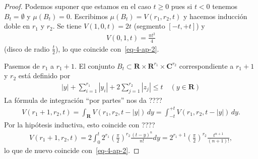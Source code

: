 \documentclass[oneside,bibtotoc,leqno,spanish]{amsbook}
\newcommand{\RR}{\mathbf{R}}
\newcommand{\CC}{\mathbf{C}}
\newcommand{\abs}[1]{\left\lvert#1\right\rvert}
\numberwithin{equation}{section}
\theoremstyle{defi}
\theoremstyle{note}
\theoremstyle{rem}
\numberwithin{theorem}{section}
\numberwithin{proposition}{section}
\numberwithin{definition}{section}
\numberwithin{lemma}{section}
\numberwithin{corollary}{section}
\numberwithin{example}{section}
\numberwithin{footnote}{section}%
\begin{document}
\begin{proof}
Podemos suponer que estamos en el caso $t\geq 0$ pues si $t < 0$ tenemos $B_{t}=\emptyset$ y $\mu(B_{t})=0$.
Escribimos $\mu(B_{t}) = V(r_{1},r_{2},t)$ y hacemos inducci\'on doble en $r_{1}$ y $r_{2}$. Se tiene
$V(1,0,t) = 2t$ (segmento $[-t,+t]$) y
\begin{gather*}
V(0,1,t)=\frac{\pi t^{2}}{4}
\end{gather*}
(disco de radio $\frac{t}{2}$), lo que coincide con~\eqref{eq-4-ap-2}.

Pasemos de $r_{1}$ a $r_{1}+1$. El conjunto $B_{t}\subset\RR\times\RR^{r_{1}}\times\CC^{r_{2}}$ correspondiente
a $r_{1}+1$ y $r_{2}$ est\'a definido por
\begin{gather*}
\abs{y}+\sum_{i=1}^{r_{1}}\abs{y_{i}}+2\sum_{j=1}^{r_{2}}\abs{z_{j}}\leq t\quad(y\in\RR)
\end{gather*}
La f\'ormula de integraci\'on ``por partes'' nos da ????
\begin{gather*}
V(r_{1}+1,r_{2},t) = \int_{\RR}V(r_{1},r_{2},t-\abs{y})\,dy=\int_{-t}^{+t}V(r_{1},r_{2},t-\abs{y})\,dy.
\end{gather*}
Por la hip\'otesis inductiva, esto coincide con ????
\begin{gather*}
V(r_{1}+1,r_{2},t) = 2\int_{0}^{t}2^{r_{1}}\left(\frac{\pi}{2}\right)^{r_{2}}\frac{(t-y)^{n}}{n!}dy
=2^{r_{1}+1}\left(\frac{\pi}{2}\right)^{r_{2}}\frac{t^{n+1}}{(n+1)!},
\end{gather*}
lo que de nuevo coincide con~\eqref{eq-4-ap-2}.


\end{proof}
\end{document}
